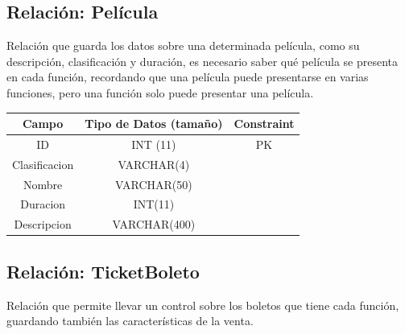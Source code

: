 \documentclass[12pt, fleqn]{report}                             %
\begin{document}
        \subsection*{Relación: Película}

            Relación que guarda los datos sobre una determinada película, como su
            descripción, clasificación y duración, es necesario saber qué película
            se presenta en cada función, recordando que una película puede presentarse
            en varias funciones, pero una función solo puede presentar una película.

            \vspace{2em}

            \small{
            \begin{tabular}{| c | c | c |}
                \hline
                \textbf{Campo} & \textbf{Tipo de Datos (tamaño)} & \textbf{Constraint} \\[0.5ex] 
                \hline\hline
                
                ID              & INT (11)         & PK                        \\
                Clasificacion   & VARCHAR(4)       &                           \\
                Nombre          & VARCHAR(50)      &                           \\
                Duracion        & INT(11)          &                           \\
                Descripcion     & VARCHAR(400)     &                           \\
                \hline
            \end{tabular}
            }



        \clearpage
        \subsection*{Relación: TicketBoleto}

            Relación que permite llevar un control sobre los boletos que tiene
            cada función, guardando también las características de la venta.

            \vspace{2em}
\end{document}
